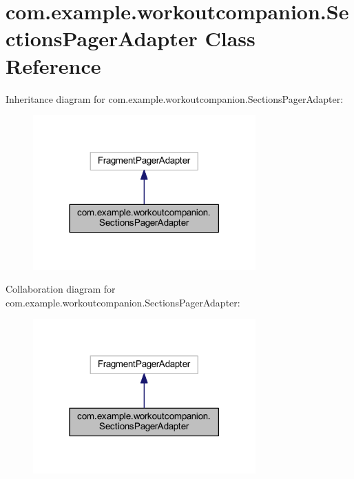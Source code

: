 \hypertarget{classcom_1_1example_1_1workoutcompanion_1_1_sections_pager_adapter}{\section{com.\-example.\-workoutcompanion.\-Sections\-Pager\-Adapter Class Reference}
\label{classcom_1_1example_1_1workoutcompanion_1_1_sections_pager_adapter}
}


Inheritance diagram for com.\-example.\-workoutcompanion.\-Sections\-Pager\-Adapter\-:
\nopagebreak
\begin{figure}[H]
\begin{center}
\leavevmode
\includegraphics[width=242pt]{classcom_1_1example_1_1workoutcompanion_1_1_sections_pager_adapter__inherit__graph}
\end{center}
\end{figure}


Collaboration diagram for com.\-example.\-workoutcompanion.\-Sections\-Pager\-Adapter\-:
\nopagebreak
\begin{figure}[H]
\begin{center}
\leavevmode
\includegraphics[width=242pt]{classcom_1_1example_1_1workoutcompanion_1_1_sections_pager_adapter__coll__graph}
\end{center}
\end{figure}
